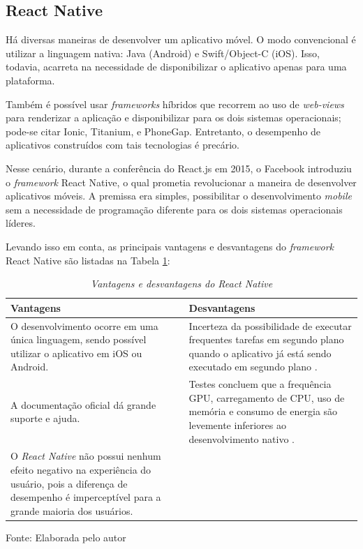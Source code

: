 \subsection{React Native} 

Há diversas maneiras de desenvolver um aplicativo móvel. O modo convencional é utilizar a linguagem nativa: Java (Android) e Swift/Object-C (iOS). Isso, todavia, acarreta na necessidade de disponibilizar o aplicativo apenas para uma plataforma. 

Também é possível usar \textit{frameworks} híbridos que recorrem ao uso de \textit{web-views} para renderizar a aplicação e disponibilizar para os dois sistemas operacionais; pode-se citar Ionic, Titanium, e PhoneGap. Entretanto, o desempenho de aplicativos construídos com tais tecnologias é precário. 

Nesse cenário, durante a conferência do React.js em 2015, o Facebook introduziu o \textit{framework} React Native, o qual prometia revolucionar a maneira de desenvolver aplicativos móveis. A premissa era simples, possibilitar o desenvolvimento \textit{mobile} sem a necessidade de programação diferente para os dois sistemas operacionais líderes.

Levando isso em conta, as principais vantagens e desvantagens do \textit{framework} React Native são listadas na Tabela \ref{tab:vanDesvRN}:

\begin{table}[!ht]
\centering
\caption{\textit{Vantagens e desvantagens do React Native}}
\centering
\footnotesize
\begin{tabular}{p{7cm} p{7cm}}
\toprule
\textbf{Vantagens} \citep{danielsson2016} & \textbf{Desvantagens}                          
\\ \midrule
O desenvolvimento ocorre em uma única linguagem, sendo possível utilizar o aplicativo em iOS ou Android.
& 
Incerteza da possibilidade de executar frequentes tarefas em segundo plano quando o aplicativo já está sendo executado em segundo plano \citep{sodebergJohansson}.
\\ \midrule

A documentação oficial dá grande suporte e ajuda.
& 
Testes concluem que a frequência GPU, carregamento de CPU, uso de memória e consumo de energia são levemente inferiores ao desenvolvimento nativo \citep{danielsson2016}.
\\ \midrule

O \textit{React Native} não possui nenhum efeito negativo na experiência do usuário, pois a diferença de desempenho é imperceptível para a grande maioria dos usuários.
& 

\\ \midrule

\end{tabular}
\label{tab:vanDesvRN}

Fonte: Elaborada pelo autor
\end{table}

